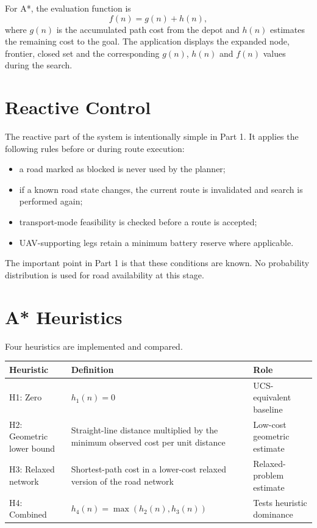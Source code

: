\documentclass[11pt,a4paper]{article}
\begin{document}
For A*, the evaluation function is
\[
    f(n)=g(n)+h(n),
\]
where $g(n)$ is the accumulated path cost from the depot and $h(n)$ estimates the remaining cost to the goal. The application displays the expanded node, frontier, closed set and the corresponding $g(n)$, $h(n)$ and $f(n)$ values during the search.

\section{Reactive Control}
The reactive part of the system is intentionally simple in Part 1. It applies the following rules before or during route execution:
\begin{itemize}
    \item a road marked as blocked is never used by the planner;
    \item if a known road state changes, the current route is invalidated and search is performed again;
    \item transport-mode feasibility is checked before a route is accepted;
    \item UAV-supporting legs retain a minimum battery reserve where applicable.
\end{itemize}

The important point in Part 1 is that these conditions are known. No probability distribution is used for road availability at this stage.

\section{A* Heuristics}
Four heuristics are implemented and compared.

\begin{center}
\begin{tabular}{p{} p{} p{}}
\toprule
\textbf{Heuristic} & \textbf{Definition} & \textbf{Role} \\
\midrule
H1: Zero & $h_1(n)=0$ & UCS-equivalent baseline \\
H2: Geometric lower bound & Straight-line distance multiplied by the minimum observed cost per unit distance & Low-cost geometric estimate \\
H3: Relaxed network & Shortest-path cost in a lower-cost relaxed version of the road network & Relaxed-problem estimate \\
H4: Combined & $h_4(n)=\max(h_2(n),h_3(n))$ & Tests heuristic dominance \\
\bottomrule
\end{tabular}
\end{center}
\end{document}
